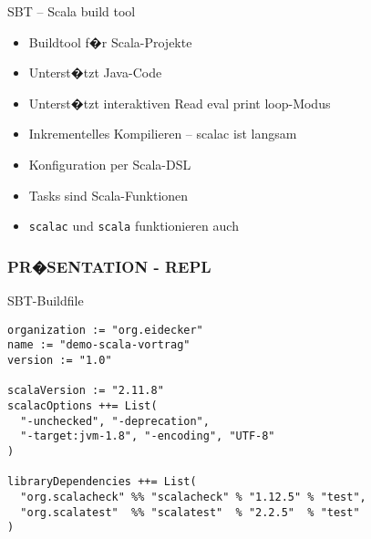 \documentclass[14pt,aspectratio=169,trans]{beamer} %
\begin{document}
\begin{frame}{}
	\begin{block}{SBT -- Scala build tool}
		\begin{itemize}
			\item<2->Buildtool f�r Scala-Projekte
			\item<3->Unterst�tzt Java-Code
			\item<4->Unterst�tzt interaktiven Read eval print loop-Modus
			\item<5->Inkrementelles Kompilieren -- scalac ist langsam
			\item<6->Konfiguration per Scala-DSL
			\item<7->Tasks sind Scala-Funktionen
			\item<8->\texttt{scalac} und \texttt{scala} funktionieren auch
		\end{itemize}
	\end{block}
\end{frame}

\subsubsection*{PR�SENTATION - REPL}


\begin{frame}[fragile]{}
	\begin{block}{SBT-Buildfile}
		\scriptsize
		\onslide<2->
  \begin{lstlisting}
organization := "org.eidecker"
name := "demo-scala-vortrag"
version := "1.0"

scalaVersion := "2.11.8"
scalacOptions ++= List(
  "-unchecked", "-deprecation",
  "-target:jvm-1.8", "-encoding", "UTF-8"
)

libraryDependencies ++= List(
  "org.scalacheck" %% "scalacheck" % "1.12.5" % "test",
  "org.scalatest"  %% "scalatest"  % "2.2.5"  % "test"
)
	\end{lstlisting}
	\end{block}
\end{frame}
\end{document}
